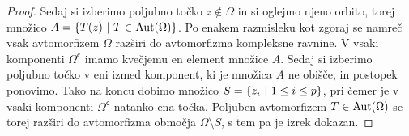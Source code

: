 \begin{proof}


Sedaj si izberimo poljubno točko $z \not \in \Omega$ in si oglejmo
njeno orbito, torej množico $A = \left\{T(z)~\middle\vert~T \in \operatorname{Aut}(\Omega)\right\}$.
Po enakem razmisleku kot zgoraj se namreč vsak avtomorfizem
$\Omega$ razširi do avtomorfizma kompleksne ravnine. V vsaki
komponenti $\Omega^\mathsf{c}$ imamo kvečjemu en element množice
$A$. Sedaj si izberimo poljubno točko v eni izmed komponent, ki je
množica $A$ ne obišče, in postopek ponovimo. Tako na koncu dobimo
množico $S = \left\{z_i~\middle\vert~1 \leq i \leq p\right\}$, pri čemer je v vsaki
komponenti $\Omega^\mathsf{c}$ natanko ena točka. Poljuben
avtomorfizem $T \in \operatorname{Aut}(\Omega)$ se torej razširi do avtomorfizma
območja $\Omega \setminus S$, s tem pa je izrek dokazan.
\end{proof}

